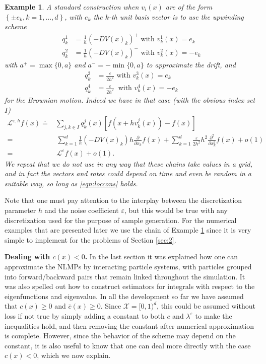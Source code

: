 \documentclass[english,11pt]{article}%
\newtheorem{example}{Example}
\numberwithin{equation}{section}
\numberwithin{example}{section}
\numberwithin{theorem}{section}
\begin{document}
\begin{example}
\label{exa:1}A standard construction when $v_{i}(x)$ are of the form $\left\{
\pm e_{k},k=1,\ldots,d\right\}  $, with $e_{k}$ the $k$-th unit basis vector is to use the upwinding scheme
\begin{align*}
q_{k}^{1}  &  =\frac{1}{h}(-DV(x)_{k})^{+}\text{ with }v_{k}^{1}(x)=e_{k}\\
q_{k}^{2}  &  =\frac{1}{h}(-DV(x)_{k})^{-}\text{ with }v_{k}^{2}(x)=-e_{k}%
\end{align*}
with $a^{+}=\max\{0,a\}$ and $a^{-}=-\min\{0,a\}$ to approximate the drift,
and
\begin{align*}
q_{k}^{3}  &  =\frac{\varepsilon}{2h^{2}}\text{ with }v_{k}^{3}(x)=e_{k}\\
q_{k}^{4}  &  =\frac{\varepsilon}{2h^{2}}\ \text{ with }v_{k}^{4}(x)=-e_{k}%
\end{align*}
for the Brownian motion. Indeed we have in that case (with the obvious index
set $I$)
\begin{align*}
\mathcal{L}^{\varepsilon,h}f(x)\doteq &  \sum_{j,k\in I}q_{k}^{j}(x)\left[
f(x+hv_{k}^{j}(x))-f(x)\right] \\
=  &  \,\sum_{k=1}^{d}\frac{1}{h}(-DV(x)_{k})h\frac{\partial}{\partial x_{k}%
}f(x)+\sum_{k=1}^{d}\frac{\varepsilon}{2h^{2}}h^{2}\frac{\partial^{2}%
}{\partial x_{k}^{2}}f(x)+o(1)\\
=  & \, \mathcal{L}^{\varepsilon}f(x)+o(1).
\end{align*}
We repeat that we do not use in any way that these chains take values in a
grid, and in fact the vectors and rates could depend on time and even be
random in a suitable way, so long as \eqref{eqn:loccons} holds.
\end{example}



Note that one must pay attention to the interplay between the discretization
parameter $h$ and the noise coefficient $\varepsilon$, but this would be true
with any discretization used for the purpose of sample generation. For the
numerical examples that are presented later we use the chain of Example
\ref{exa:1} since it is very simple to implement for the problems of Section
\ref{sec:2}.  

\vspace{\baselineskip} {\textbf{Dealing with $c(x)<0$.}} In the last section
it was explained how one can approximate the NLMPs by interacting particle
systems, with particles grouped into forward/backward pairs that remain linked
throughout the simulation. It was also spelled out how to construct estimators
for integrals with respect to the eigenfunctions and eigenvalue. In all the
development so far we have assumed that $c(x)\geq0$ and $\bar{c}(x) \geq0$.
Since $\mathcal{X}=[0,1)^{d}$, this could be assumed without loss if not true
by simply adding a constant to both $c$ and $\lambda^{\varepsilon}$ to make
the inequalities hold, and then removing the constant after numerical
approximation is complete. However, since the behavior of the scheme may
depend on the constant, it is also useful to know that one can deal more
directly with the case $c(x)<0$, which we now explain.
\end{document}
